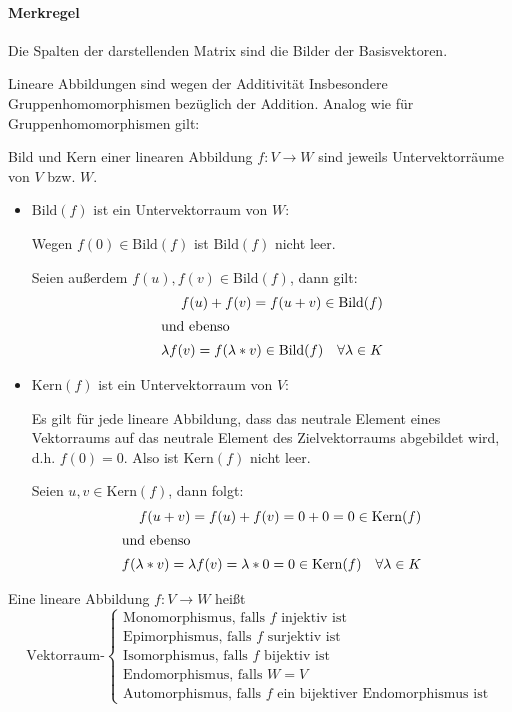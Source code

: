 \paragraph{Merkregel}
Die Spalten der darstellenden Matrix sind die Bilder der Basisvektoren.
\par\bigskip


Lineare Abbildungen sind wegen der Additivität Insbesondere Gruppenhomomorphismen bezüglich der Addition. Analog wie für Gruppenhomomorphismen gilt:

\begin{satz}{}
  Bild und Kern einer linearen Abbildung $f:V\rightarrow W$ sind jeweils Untervektorräume von $V$ bzw. $W$.
\end{satz}

\beweis
\begin{itemize}
	\item $\mathrm{Bild}(f)$ ist ein Untervektorraum von $W$:

	Wegen $f(0)\in\mathrm{Bild}(f)$ ist $\mathrm{Bild}(f)$ nicht leer.

	Seien außerdem $f(u),f(v)\in\mathrm{Bild}(f)$, dann gilt:
	\begin{align*}
		f(u)+f(v)=f(u+v)\in\mathrm{Bild}(f)\\
		\intertext{und ebenso}
		\lambda f(v)=f(\lambda*v)\in\mathrm{Bild}(f) \quad \forall\lambda\in K
	\end{align*}

	\item $\mathrm{Kern}(f)$ ist ein Untervektorraum von $V$:

	Es gilt für jede lineare Abbildung, dass das neutrale Element eines Vektorraums auf das neutrale Element des Zielvektorraums abgebildet wird, d.h. $f(0)=0$. Also ist $\mathrm{Kern}(f)$ nicht leer.

	Seien $u,v\in \mathrm{Kern}(f)$, dann folgt:
	\begin{align*}
		f(u+v)=f(u)+f(v)=0+0=0 \in\mathrm{Kern}(f)\\
		\intertext{und ebenso}
		f(\lambda *v)=\lambda f(v)=\lambda*0=0\in\mathrm{Kern}(f) \quad\forall \lambda\in K
	\end{align*}
\end{itemize}


\begin{definition}{}
  Eine lineare Abbildung $f: V\rightarrow W$ heißt
  \begin{equation*}
    \text{Vektorraum-}
    \begin{cases}
      \text{Monomorphismus, falls $f$ injektiv ist}\\
      \text{Epimorphismus, falls $f$ surjektiv ist}\\
      \text{Isomorphismus, falls $f$ bijektiv ist}\\
			\text{Endomorphismus, falls $W=V$}\\
			\text{Automorphismus, falls $f$ ein bijektiver Endomorphismus ist}
    \end{cases}
  \end{equation*}
\end{definition}
